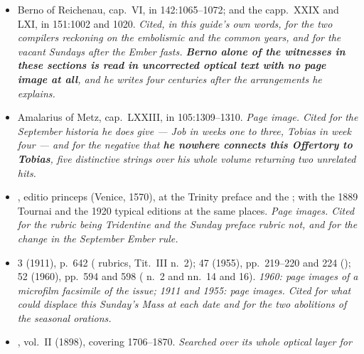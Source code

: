\begin{itemize}[leftmargin=1.2em, itemsep=0.15em]
against the 1568 Durandus-and-Beleth volume. \textit{Page images of unregistered
Internet Archive items. Cited for this Sunday's Epistle standing beside the ten
lepers, for the three September schemes, and for Durandus's  at four elements of this Sunday and not at its Introit or Offertory.
\textbf{Durandus's chant set for this Sunday was collated against a second early
printing because the two  incipits differ by one letter.}}
\item Berno of Reichenau,  cap.~VI, in 
142:1065--1072; and the  capp.~XXIX and LXI, in
 151:1002 and 1020. \textit{Cited, in this guide's own
words, for the two compilers reckoning on the embolismic and the common years,
and for the vacant Sundays after the Ember fasts. \textbf{Berno alone of the
witnesses in these sections is read in uncorrected optical text with no page
image at all}, and he writes four centuries after the arrangements he explains.}
\item Amalarius of Metz,  cap.~LXXIII, in
 105:1309--1310. \textit{Page image. Cited for the
September \emph{historia} he does give --- Job in weeks one to three, Tobias in
week four --- and for the negative that \textbf{he nowhere connects this
Offertory to Tobias}, five distinctive strings over his whole volume returning
two unrelated hits.}
\item {}, editio princeps (Venice, 1570), at the Trinity
preface and the ; with the 1889 Tournai and the
1920 typical editions at the same places. \textit{Page images. Cited for the
 rubric being Tridentine and the Sunday preface rubric not, and for
the change in the September Ember rule.}
\item {} 3 (1911), p.~642 (
rubrics, Tit.~III n.~2); 47 (1955), pp.~219--220 and 224 (); 52 (1960), pp.~594 and 598 ( n.~2 and
 nn.~14 and 16). \textit{1960: page images of a microfilm facsimile
of the issue; 1911 and 1955: page images. Cited for what
could displace this Sunday's Mass at each date and for the two abolitions of the
seasonal orations.}
\item {}, vol.~II (1898),
covering 1706--1870. \textit{Searched over its whole optical layer for
}
\end{itemize}
